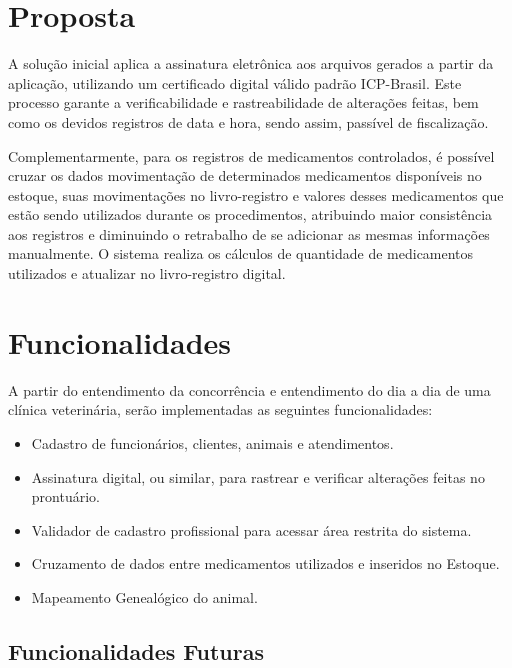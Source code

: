 \documentclass[
    12pt,               %
    openright,          %
    oneside,
    a4paper,            %
    BIBLATEX,           %
    TODO,               %
    english,            %
    brazil              %
    ]{ifsp-spo-inf-ctds}
\begin{document}
    \section{Proposta}
    
        A solução inicial aplica a assinatura eletrônica aos arquivos gerados a partir da aplicação, utilizando um certificado digital válido padrão ICP-Brasil. Este processo garante a verificabilidade e rastreabilidade de alterações feitas, bem como os devidos registros de data e hora, sendo assim, passível de fiscalização.
        
        Complementarmente, para os registros de medicamentos controlados, é possível cruzar os dados movimentação de determinados medicamentos disponíveis no estoque, suas movimentações no livro-registro e valores desses medicamentos que estão sendo utilizados durante os procedimentos, atribuindo maior consistência aos registros e diminuindo o retrabalho de se adicionar as mesmas informações manualmente. O sistema realiza os cálculos de quantidade de medicamentos utilizados e atualizar no livro-registro digital.

    \section{Funcionalidades}
    
        A partir do entendimento da concorrência e entendimento do dia a dia de uma clínica veterinária, serão implementadas as seguintes funcionalidades:
    
        \begin{itemize}
            \item Cadastro de funcionários, clientes, animais e atendimentos.
            \item Assinatura digital, ou similar, para rastrear e verificar alterações feitas no prontuário.
            \item Validador de cadastro profissional para acessar área restrita do sistema.
            \item Cruzamento de dados entre medicamentos utilizados e inseridos no Estoque.
            \item Mapeamento Genealógico do animal.
        \end{itemize}
    
        \subsection{Funcionalidades Futuras}
            
\end{document}
